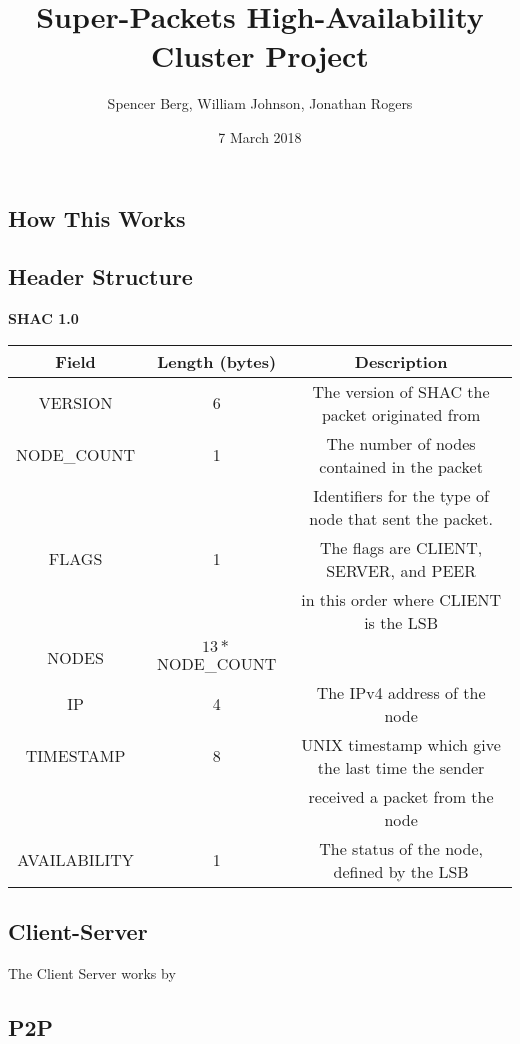 \documentclass[11pt]{article}
\title{Super-Packets High-Availability Cluster Project}
\author{Spencer Berg, William Johnson, Jonathan Rogers}
\date{7 March 2018}
\begin{document}
\maketitle

\thispagestyle{empty}

\begin{doublespace}
\section{How This Works}

\subsection{Header Structure}
\begin{center}
\textbf{SHAC 1.0}
\begin{tabular}{|c|c|c|}
\hline
Field & Length (bytes) & Description \\
\hline
VERSION & 6 & The version of SHAC the packet originated from \\
\hline
NODE\_COUNT & 1 & The number of nodes contained in the packet \\
\hline
 &  & Identifiers for the type of node that sent the packet.\\
FLAGS & 1 & The flags are CLIENT, SERVER, and PEER \\ 
 & & in this order where CLIENT is the LSB \\
\hline
NODES & $13*$NODE\_COUNT& \\
\hdashline
IP & 4 & The IPv4 address of the node \\
\hdashline
TIMESTAMP & 8 & UNIX timestamp which give the last time the sender\\
& & received a packet from the node \\
\hdashline
AVAILABILITY & 1 & The status of the node, defined by the LSB \\
\hline
\end{tabular}
\end{center}

\subsection{Client-Server}

The Client Server works by

\subsection{P2P}




\end{doublespace}
\end{document}
